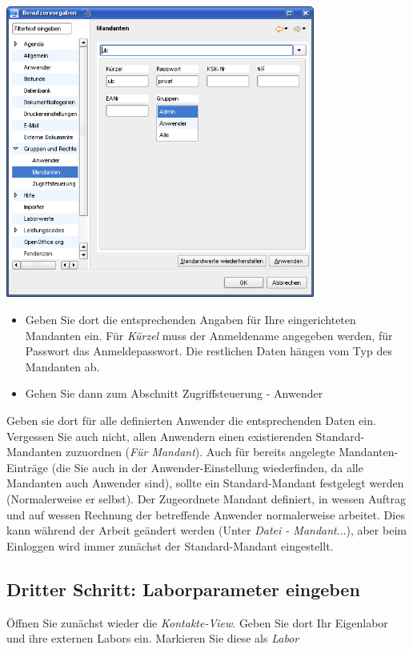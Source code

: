 \includegraphics[width=4in]{images/grundkonfmand.png}
\begin{itemize}
 \item Geben Sie dort die entsprechenden Angaben für Ihre eingerichteten Mandanten ein. Für \textit{Kürzel} muss der Anmeldename angegeben werden, für Passwort das Anmeldepasswort. Die restlichen Daten hängen vom Typ des Mandanten ab.
 \item Gehen Sie dann zum Abschnitt Zugriffsteuerung - Anwender
\end{itemize}

Geben sie dort für alle definierten Anwender die entsprechenden Daten ein. Vergessen Sie auch nicht, allen Anwendern einen existierenden Standard-Mandanten zuzuordnen (\textit{Für Mandant}). Auch für bereits angelegte Mandanten-Einträge (die Sie auch in der Anwender-Einstellung wiederfinden, da alle Mandanten auch Anwender sind), sollte ein Standard-Mandant festgelegt werden (Normalerweise er selbst). Der Zugeordnete Mandant definiert, in wessen Auftrag und auf wessen Rechnung der betreffende Anwender normalerweise arbeitet. Dies kann während der Arbeit geändert werden (Unter \textit{Datei - Mandant}...), aber beim Einloggen wird immer zunächst der Standard-Mandant eingestellt.

\subsection{Dritter Schritt: Laborparameter eingeben}
Öffnen Sie zunächst wieder die \textit{Kontakte-View}. Geben Sie dort Ihr Eigenlabor und ihre externen Labors ein. Markieren Sie diese als \textit{Labor}

